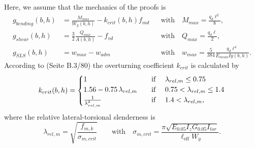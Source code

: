 \documentclass[a4paper]{article}
\begin{document}
Here, we assume that the mechanics of the proofs is
	\begin{align*}
		g_{bending}(b,h) &= \tfrac{M_{max}}{W_y(b,h)}- k_{crit}(b,h)f_{md}  &&\mbox{with} \quad M_{max} = \tfrac{q_d\ell^2}{8},\\
		g_{shear}(b,h) &= \tfrac{3}{2}\tfrac{Q_{max}}{A(b,h)} - f_{vd} &&\mbox{with} \quad Q_{max} = \tfrac{q_d\ell}{2},\\
		g_{SLS}(b,h) &= w_{max} - w_{adm}&&\mbox{with} \quad w_{max} = \tfrac{5}{384} \tfrac{ q_d  \ell^4}{E_{mean} Iy(b,h)}.
	\end{align*}
According to (Seite B.3/80) the overturning coefficient $k_{crit}$ is calculated by 
	\begin{align*}
		k_{crit}(b,h) = \begin{cases}
			1 \quad &\text{if \quad} \lambda_{rel,m} \leq 0.75\\
			1.56-0.75 \,\lambda_{rel,m} \quad &\text{if \quad} 0.75 < \lambda_{rel,m} \leq 1.4\\
			\frac{1}{\lambda_{rel,m}^2} \quad &\text{if \quad} 1.4 < \lambda_{rel,m},
		\end{cases}
	\end{align*}
where the relative lateral-torsional slenderness is
\begin{equation*}
	\lambda_{rel,m} = \sqrt{\frac{f_{m,k}}{\sigma_{m,crit}}} \qquad \mbox{with} \quad \sigma_{m,crit} = \frac{\pi\sqrt{E_{0.05}I_zG_{0.05}I_{tor}}}{\ell_\text{eff}{W_y}}.
\end{equation*}    
\end{document}

